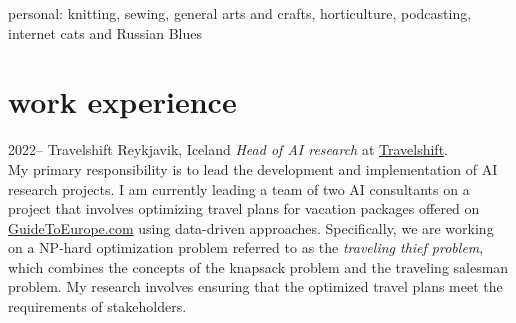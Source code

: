 \documentclass[]{cv} %
\begin{document}
{\boldfont personal:} knitting, sewing, general arts and crafts, horticulture,  podcasting, internet cats and Russian Blues



\section{work experience}


\begin{entrylist}
\entry
{2022--}
{Travelshift}
{Reykjavik, Iceland}
{\emph{Head of AI research} at
	\href{https://www.travelshift.com/}{Travelshift}.\\
My primary responsibility is to lead the development and implementation of AI research projects. I am currently leading a team of two AI consultants on a project that involves optimizing travel plans for vacation packages offered on \href{www.guidetoeurope.com}{GuideToEurope.com} using data-driven approaches. Specifically, we are working on a NP-hard optimization problem referred to as the \emph{traveling thief problem}, which combines the concepts of the knapsack problem and the traveling salesman problem. My research involves ensuring that the optimized travel plans meet the requirements of stakeholders. %
}
\end{entrylist}

\newpage
\removeaside
\end{document}
